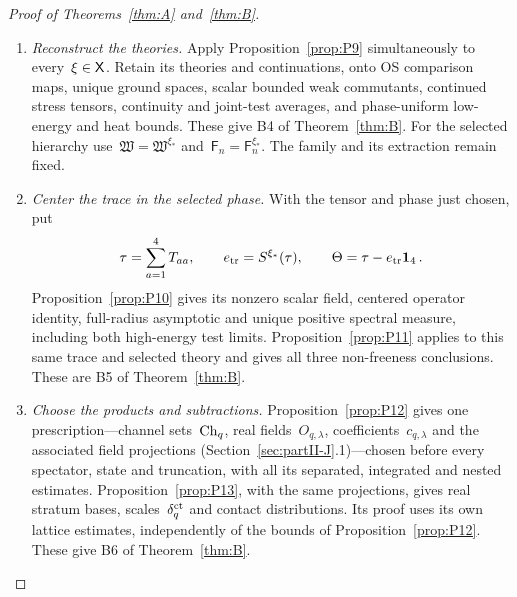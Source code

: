 \begin{proof}[Proof of Theorems~\ref{thm:A} and~\ref{thm:B}]
\begin{enumerate}[label=\emph{Step \arabic*:},ref=\arabic*,leftmargin=4.5em,itemsep=0.4em,beginpenalty=10000]
\item\label{step:deduction-reconstruction} \emph{Reconstruct the theories.} Apply Proposition~\ref{prop:P9} simultaneously to every~$\xi\in\mathsf{X}$. Retain its theories and continuations, onto OS comparison maps, unique ground spaces, scalar bounded weak commutants, continued stress tensors, continuity and joint-test averages, and phase-uniform low-energy and heat bounds. These give B4 of Theorem~\ref{thm:B}. For the selected hierarchy use~$\mathfrak W=\mathfrak W^{\xi_*}$ and~$\mathsf F_n=\mathsf F_n^{\xi_*}$. The family and its extraction remain fixed.

\item\label{step:deduction-trace} \emph{Center the trace in the selected phase.} With the tensor and phase just chosen, put
\begin{equation}\label{eq:deduction-trace}
\tau=\sum_{a=1}^4T_{aa},\qquad e_{\rm tr}=S^{\xi_*}(\tau),\qquad \Theta=\tau-e_{\rm tr}\mathbf{1}_{4}\,.
\end{equation}
Proposition~\ref{prop:P10} gives its nonzero scalar field, centered operator identity, full-radius asymptotic and unique positive spectral measure, including both high-energy test limits. Proposition~\ref{prop:P11} applies to this same trace and selected theory and gives all three non-freeness conclusions. These are B5 of Theorem~\ref{thm:B}.

\item\label{step:deduction-products} \emph{Choose the products and subtractions.} Proposition~\ref{prop:P12} gives one prescription---channel sets~$\mathrm{Ch}_{q}$, real fields~$O_{q,\lambda}$, coefficients~$c_{q,\lambda}$ and the associated field projections (Section~\ref{sec:partII-J}.1)---chosen before every spectator, state and truncation, with all its separated, integrated and nested estimates. Proposition~\ref{prop:P13}, with the same projections, gives real stratum bases, scales~$\delta_q^{\rm ct}$ and contact distributions. Its proof uses its own lattice estimates, independently of the bounds of Proposition~\ref{prop:P12}. These give B6 of Theorem~\ref{thm:B}.


\end{enumerate}
\end{proof}
